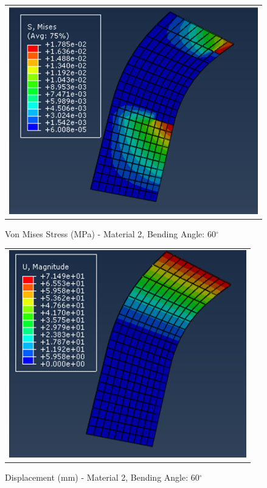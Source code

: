\documentclass[a4paper,12pt]{article}
\numberwithin{equation}{section}
\numberwithin{figure}{section}
\begin{document}
\begin{figure}[H]
  \centering
  \begin{tabular}{@{}c@{}}
    \includegraphics[width=0.7\linewidth,height=255pt]{Results/Bending/M2_VMS_60.png} \\
  \end{tabular}
  \caption{Von Mises Stress (MPa) - Material 2,  Bending Angle: 60$^{\circ}$ }
\end{figure}

\begin{figure}[H]
  \centering
  \begin{tabular}{@{}c@{}}
    \includegraphics[width=0.7\linewidth,height=255pt]{Results/Bending/M2_DIS_60.png} \\
  \end{tabular}
  \caption{Displacement (mm) - Material 2, Bending Angle: 60$^{\circ}$ }
\end{figure}
\end{document}

